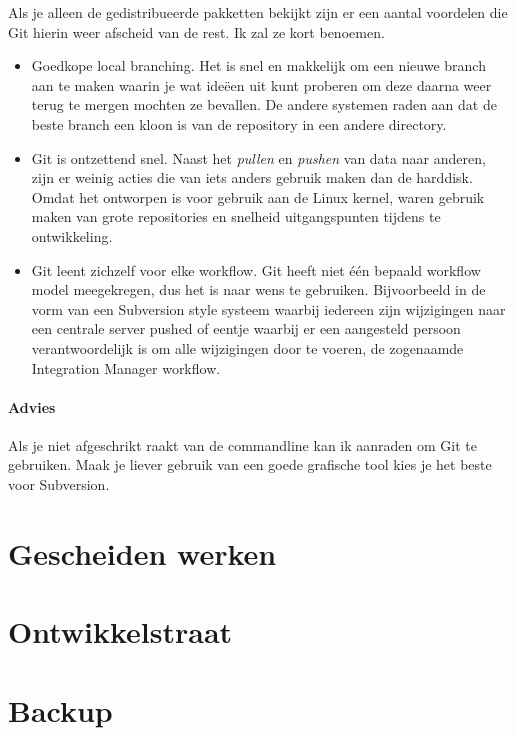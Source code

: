 Als je alleen de gedistribueerde pakketten bekijkt zijn er een aantal voordelen die Git hierin weer afscheid van de rest. Ik zal ze kort benoemen.

\begin{itemize}
  \item Goedkope local branching. Het is snel en makkelijk om een nieuwe branch aan te maken waarin je wat ide\"{e}en uit kunt proberen om deze daarna weer terug te mergen mochten ze bevallen. De andere systemen raden aan dat de beste branch een kloon is van de repository in een andere directory.
  \item Git is ontzettend snel. Naast het \emph{pullen} en \emph{pushen} van data naar anderen, zijn er weinig acties die van iets anders gebruik maken dan de harddisk. Omdat het ontworpen is voor gebruik aan de Linux kernel, waren gebruik maken van grote repositories en snelheid uitgangspunten tijdens te ontwikkeling.
  \item Git leent zichzelf voor elke workflow. Git heeft niet \'{e}\'{e}n bepaald workflow model meegekregen, dus het is naar wens te gebruiken. Bijvoorbeeld in de vorm van een Subversion style systeem waarbij iedereen zijn wijzigingen naar een centrale server pushed of eentje waarbij er een aangesteld persoon verantwoordelijk is om alle wijzigingen door te voeren, de zogenaamde Integration Manager workflow.
\end{itemize}

\paragraph{Advies} Als je niet afgeschrikt raakt van de commandline kan ik aanraden om Git te gebruiken. Maak je liever gebruik van een goede grafische tool kies je het beste voor Subversion.

\section{Gescheiden werken}



\section{Ontwikkelstraat}



\section{Backup}




